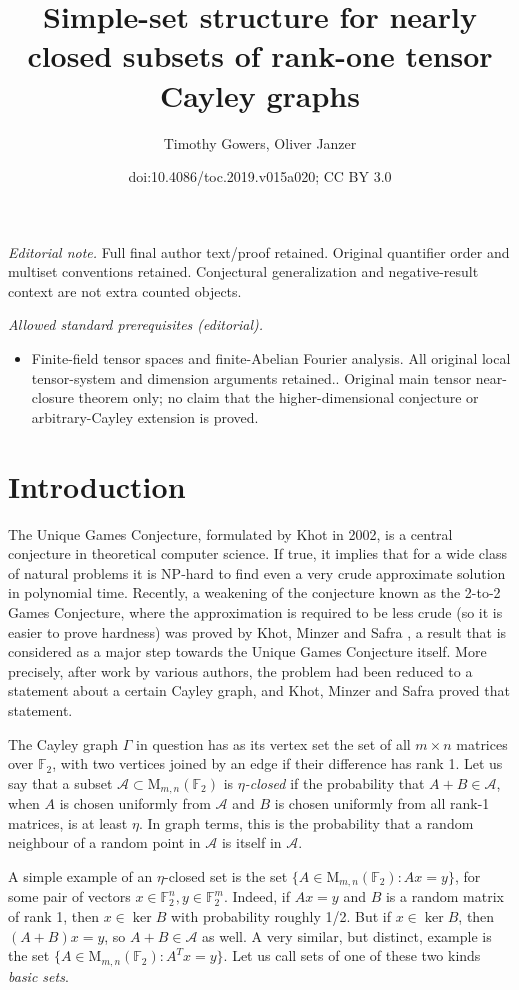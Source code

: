 \documentclass[11pt]{article}
\title{Simple-set structure for nearly closed subsets of rank-one tensor Cayley graphs}
\author{Timothy Gowers, Oliver Janzer}
\date{doi:10.4086/toc.2019.v015a020; CC BY 3.0}
\numberwithin{equation}{section}
\theoremstyle{definition}
\theoremstyle{plain}
\newcommand{\cclass}[1]{\textsf{#1}}
\newcommand\F{\mathbb{F}}
\newcommand \cA{\mathcal A}
\newcommand \mn{\mathrm{M}_{m,n}(\F_2)}
\begin{document}
\maketitle
\noindent\textit{Editorial note.} Full final author text/proof retained. Original quantifier order and multiset conventions retained. Conjectural generalization and negative-result context are not extra counted objects.\par\medskip
\noindent\textit{Allowed standard prerequisites (editorial).}\begin{itemize}
\item Finite-field tensor spaces and finite-Abelian Fourier analysis. All original local tensor-system and dimension arguments retained.. Original main tensor near-closure theorem only; no claim that the higher-dimensional conjecture or arbitrary-Cayley extension is proved.
\end{itemize}\medskip
\section{Introduction}

The Unique Games Conjecture, formulated by Khot \cite{khot} in 2002, is a central conjecture in theoretical computer science. If true, it implies that for a wide class of natural problems it is \cclass{NP}-hard to find even a very crude approximate solution in polynomial time. Recently, a weakening of the conjecture known as the 2-to-2 Games Conjecture, where the approximation is required to be less crude (so it is easier to prove hardness) was proved by Khot, Minzer and Safra \cite{KMS}, a result that is considered as a major step towards the Unique Games Conjecture itself. More precisely, after work by various authors, the problem had been reduced to a statement about a certain Cayley graph, and Khot, Minzer and Safra proved that statement.

The Cayley graph $\Gamma$ in question has as its vertex set the set of all $m\times n$ matrices over $\F_2$, with two vertices joined by an edge if their difference has rank 1. Let us say that a subset $\mathcal A\subset\mn$ is \emph{$\eta$-closed} if the probability that $A+B\in\cA$, when $A$ is chosen uniformly from $\cA$ and $B$ is chosen uniformly from all rank-1 matrices, is at least $\eta$. In graph terms, this is the probability that a random neighbour of a random point in $\cA$ is itself in $\cA$. 

A simple example of an $\eta$-closed set is the set $\{A\in\mn:Ax=y\}$, for some pair of vectors $x\in \F_2^n,y\in\F_2^m$. Indeed, if $Ax=y$ and $B$ is a random matrix of rank 1, then $x\in\ker B$ with probability roughly 1/2.
But if $x\in\ker B$, then $(A+B)x=y$, so $A+B\in\cA$ as well. A very similar, but distinct, example is the set $\{A\in\mn:A^Tx=y\}$. Let us call sets of one of these two kinds \emph{basic sets}.
\end{document}
